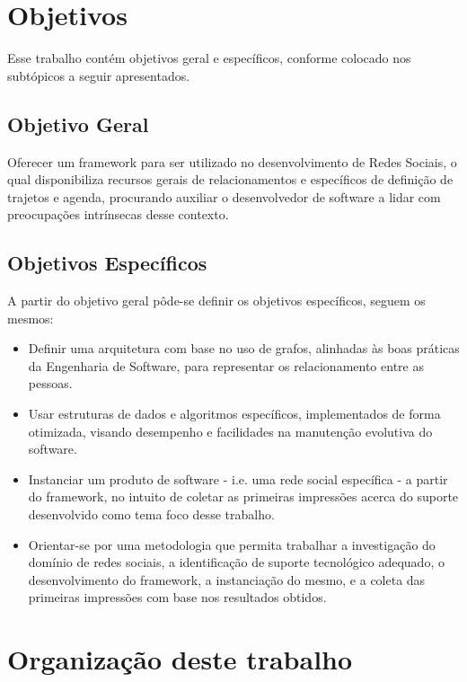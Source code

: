 \section{Objetivos}

Esse trabalho contém objetivos geral e específicos, conforme colocado nos subtópicos a seguir apresentados.

\subsection{Objetivo Geral}

Oferecer um framework para ser utilizado no desenvolvimento de Redes Sociais, o qual disponibiliza recursos gerais de relacionamentos e específicos de definição de trajetos e agenda, procurando auxiliar o desenvolvedor de software a lidar com preocupações intrínsecas desse contexto.

\subsection{Objetivos Específicos}

A partir do objetivo geral pôde-se definir os objetivos específicos, seguem os mesmos:

\begin{itemize}
	\item Definir uma arquitetura com base no uso de grafos, alinhadas às boas práticas da Engenharia de Software, para representar os relacionamento entre as pessoas.
	\item Usar estruturas de dados e algoritmos específicos, implementados de forma otimizada, visando desempenho e facilidades na manutenção evolutiva do software.
	\item Instanciar um produto de software - i.e. uma rede social específica - a partir do framework, no intuito de coletar as primeiras impressões acerca do suporte desenvolvido como tema foco desse trabalho.
	\item Orientar-se por uma metodologia que permita trabalhar a investigação do domínio de redes sociais, a identificação de suporte tecnológico adequado, o desenvolvimento do framework, a instanciação do mesmo, e a coleta das primeiras impressões com base nos resultados obtidos.
\end{itemize}

\section{Organização deste trabalho}

